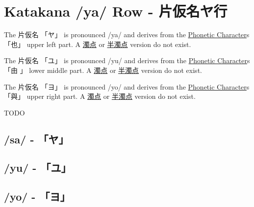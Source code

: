 \section{Katakana /ya/ Row - 片仮名ヤ行}\label{sec:KatakanaYaRow}


 The  片仮名 {「ヤ」} is pronounced  /ya/ and  derives from the
\hyperref[sec:PhoneticCharacter]{Phonetic Character}s {「也」} upper left part.  A
\hyperref[sec:Dakuten]{濁点} or \hyperref[sec:Handakuten]{半濁点} version do
not exist.

 The  片仮名 {「ユ」} is pronounced  /yu/ and  derives from the
\hyperref[sec:PhoneticCharacter]{Phonetic Character}s {「由 」} lower middle part.  A
\hyperref[sec:Dakuten]{濁点} or \hyperref[sec:Handakuten]{半濁点} version do
not exist.

 The  片仮名 {「ヨ」} is pronounced  /yo/ and  derives from the
\hyperref[sec:PhoneticCharacter]{Phonetic Character}s {「與」} upper right part.  A
\hyperref[sec:Dakuten]{濁点} or \hyperref[sec:Handakuten]{半濁点} version do
not exist.

\newpage
TODO

\newpage

\subsection{/sa/ - 「ヤ」}\label{sec:KatakanaYa}

 

\subsection{/yu/ - 「ユ」}\label{sec:KatakanaYu}

 

\subsection{/yo/ - 「ヨ」}\label{sec:KatakanaYo}

 






\newpage
